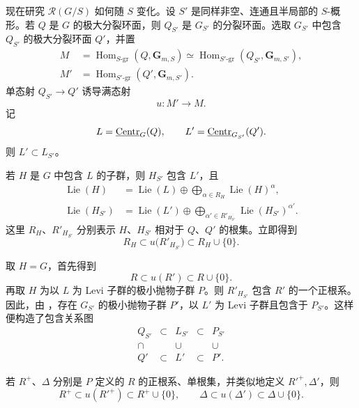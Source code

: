 

现在研究 \(\mathcal R(G/S)\) 如何随 \(S\) 变化。设 \(S'\) 是同样非空、连通且半局部的 \(S\)-概形。若 \(Q\) 是 \(G\) 的极大分裂环面，则 \(Q_{S'}\) 是 \(G_{S'}\) 的分裂环面。选取 \(G_{S'}\) 中包含 \(Q_{S'}\) 的极大分裂环面 \(Q'\)，并置
\[
\begin{aligned}
 M&=\operatorname{Hom}_{S\text{-}\mathrm{gr}}
       (Q,\mathbf G_{m,S})
   \simeq
   \operatorname{Hom}_{S'\text{-}\mathrm{gr}}
       (Q_{S'},\mathbf G_{m,S'}),\\
 M'&=\operatorname{Hom}_{S'\text{-}\mathrm{gr}}
       (Q',\mathbf G_{m,S'}).
\end{aligned}
\]
单态射 \(Q_{S'}\to Q'\) 诱导满态射
\[
 u:M'\longrightarrow M.
\]
记
\[
 L=\underline{\operatorname{Centr}}_G(Q),\qquad L'=\underline{\operatorname{Centr}}_{G_{S'}}(Q').
\]
则 \(L'\subset L_{S'}\)。

若 \(H\) 是 \(G\) 中包含 \(L\) 的子群，则 \(H_{S'}\) 包含 \(L'\)，且
\[
\begin{aligned}
 \operatorname{Lie}(H)
  &=\operatorname{Lie}(L)
    \oplus\bigoplus_{\alpha\in R_H}
       \operatorname{Lie}(H)^\alpha,\\
 \operatorname{Lie}(H_{S'})
  &=\operatorname{Lie}(L')
    \oplus\bigoplus_{\alpha'\in R'_{H_{S'}}}
       \operatorname{Lie}(H_{S'})^{\alpha'}.
\end{aligned}
\]
这里 \(R_H\)、\(R'_{H_{S'}}\) 分别表示 \(H\)、\(H_{S'}\) 相对于 \(Q\)、\(Q'\) 的根集。立即得到
\[
 R_H\subset u\bigl(R'_{H_{S'}}\bigr)
       \subset R_H\cup\{0\}.
\]

取 \(H=G\)，首先得到
\[
 R\subset u(R')\subset R\cup\{0\}.
\]
再取 \(H\) 为以 \(L\) 为 Levi 子群的极小抛物子群 \(P\)。则 \(R'_{H_{S'}}\) 包含 \(R'\) 的一个正根系。因此，由 ，存在 \(G_{S'}\) 的极小抛物子群 \(P'\)，以 \(L'\) 为 Levi 子群且包含于 \(P_{S'}\)。这样便构造了包含关系图
\[
\begin{array}{ccccc}
 Q_{S'} & \subset & L_{S'} & \subset & P_{S'}\\[1.2ex]
 \cap   &         & \cup   &         & \cup\\[1.2ex]
 Q'     & \subset & L'     & \subset & P'.
\end{array}
\]

若 \(R^+\)、\(\Delta\) 分别是 \(P\) 定义的 \(R\) 的正根系、单根集，并类似地定义 \(R'^+,\Delta'\)，则
\[
 R^+\subset u(R'^+)\subset R^+\cup\{0\},
 \qquad
 \Delta\subset u(\Delta')\subset\Delta\cup\{0\}.
\]


